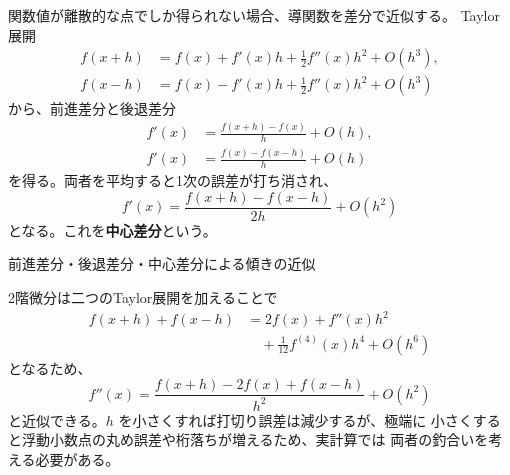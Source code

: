 関数値が離散的な点でしか得られない場合、導関数を差分で近似する。
Taylor展開
\begin{align*}
 f(x+h)&=f(x)+f'(x)h+\frac12f''(x)h^2+O(h^3),\\
 f(x-h)&=f(x)-f'(x)h+\frac12f''(x)h^2+O(h^3)
\end{align*}
から、前進差分と後退差分
\begin{align}
 f'(x)&=\frac{f(x+h)-f(x)}h+O(h),\\
 f'(x)&=\frac{f(x)-f(x-h)}h+O(h)
\end{align}
を得る。両者を平均すると1次の誤差が打ち消され、
\begin{equation}
 \boxed{f'(x)=\frac{f(x+h)-f(x-h)}{2h}+O(h^2)}
\end{equation}
となる。これを\textbf{中心差分}という。

\begin{center}

\small 前進差分・後退差分・中心差分による傾きの近似
\end{center}

2階微分は二つのTaylor展開を加えることで
\begin{align*}
 f(x+h)+f(x-h)
 &=2f(x)+f''(x)h^2\\
 &\quad+\frac1{12}f^{(4)}(x)h^4+O(h^6)
\end{align*}
となるため、
\begin{equation}
 \boxed{f''(x)=\frac{f(x+h)-2f(x)+f(x-h)}{h^2}+O(h^2)}
\end{equation}
と近似できる。$h$ を小さくすれば打切り誤差は減少するが、極端に
小さくすると浮動小数点の丸め誤差や桁落ちが増えるため、実計算では
両者の釣合いを考える必要がある。
